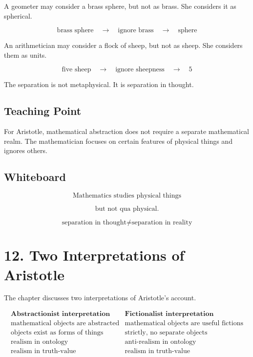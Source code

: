 \documentclass[11pt]{article}
\begin{document}
A geometer may consider a brass sphere, but not as brass. She considers it as spherical.

\[
\text{brass sphere}
\quad \longrightarrow
\quad
\text{ignore brass}
\quad \longrightarrow
\quad
\text{sphere}
\]

An arithmetician may consider a flock of sheep, but not as sheep. She considers them as
units.

\[
\text{five sheep}
\quad \longrightarrow
\quad
\text{ignore sheepness}
\quad \longrightarrow
\quad
5
\]

The separation is not metaphysical. It is separation in thought.

\subsection*{Teaching Point}

For Aristotle, mathematical abstraction does not require a separate mathematical realm.
The mathematician focuses on certain features of physical things and ignores others.

\subsection*{Whiteboard}

\[
\text{Mathematics studies physical things}
\]

\[
\text{but not qua physical.}
\]

\[
\text{separation in thought}
\neq
\text{separation in reality}
\]

\section*{12. Two Interpretations of Aristotle}

The chapter discusses two interpretations of Aristotle's account.

\[
\begin{array}{c|c}
\textbf{Abstractionist interpretation} & \textbf{Fictionalist interpretation} \\
\hline
\text{mathematical objects are abstracted} & \text{mathematical objects are useful fictions} \\
\text{objects exist as forms of things} & \text{strictly, no separate objects} \\
\text{realism in ontology} & \text{anti-realism in ontology} \\
\text{realism in truth-value} & \text{realism in truth-value}
\end{array}
\]
\end{document}
